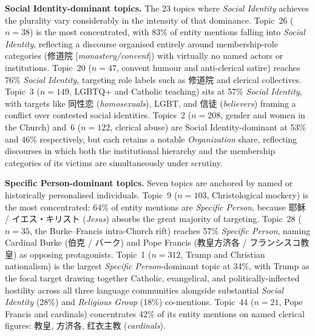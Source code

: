 \documentclass[../CLthesis.tex]{subfiles}
\begin{document}
\textbf{Social Identity-dominant topics.}
The 23 topics where \textit{Social Identity} achieves the plurality vary considerably in the intensity of that dominance. Topic~26 ($n=38$) is the most concentrated, with 83\% of entity mentions falling into \textit{Social Identity}, reflecting a discourse organised entirely around membership-role categories (修道院 [\textit{monastery/convent}]) with virtually no named actors or institutions. Topic~20 ($n=47$, convent humour and anti-clerical satire) reaches 76\% \textit{Social Identity}, targeting role labels such as 修道院 and clerical collectives. Topic~3 ($n=149$, LGBTQ+ and Catholic teaching) sits at 57\% \textit{Social Identity}, with targets like 同性恋 (\textit{homosexuals}), LGBT, and 信徒 (\textit{believers}) framing a conflict over contested social identities. Topics~2 ($n=208$, gender and women in the Church) and~6 ($n=122$, clerical abuse) are Social Identity-dominant at 53\% and 46\% respectively, but each retains a notable \textit{Organization} share, reflecting discourses in which both the institutional hierarchy and the membership categories of its victims are simultaneously under scrutiny.

\textbf{Specific Person-dominant topics.}
Seven topics are anchored by named or historically personalised individuals. Topic~9 ($n=103$, Christological mockery) is the most concentrated: 64\% of entity mentions are \textit{Specific Person}, because 耶稣 / イエス・キリスト (\textit{Jesus}) absorbs the great majority of targeting. Topic~28 ($n=35$, the Burke--Francis intra-Church rift) reaches 57\% \textit{Specific Person}, naming Cardinal Burke (伯克 / バーク) and Pope Francis (教皇方济各 / フランシスコ教皇) as opposing protagonists. Topic~1 ($n=312$, Trump and Christian nationalism) is the largest \textit{Specific Person}-dominant topic at 34\%, with Trump as the focal target drawing together Catholic, evangelical, and politically-inflected hostility across all three language communities alongside substantial \textit{Social Identity} (28\%) and \textit{Religious Group} (18\%) co-mentions. Topic~44 ($n=21$, Pope Francis and cardinals) concentrates 42\% of its entity mentions on named clerical figures: 教皇, 方济各, 红衣主教 (\textit{cardinals}).
\end{document}
